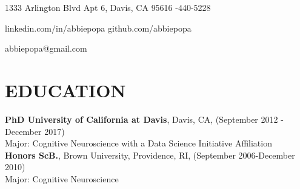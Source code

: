 \documentclass[line,margin,10pt]{res}
\begin{document}
 
\begin{resume}
\hoffset\centerline 
{1333 Arlington Blvd Apt 6, Davis, CA 95616  \quad \quad \quad \quad \quad \quad \quad \quad \quad \quad \quad\quad \quad \quad \quad \quad \quad \quad \quad \quad \quad \quad  \quad \quad {}-440-5228}
\hoffset\centerline 
{\hspace{0.05cm} linkedin.com/in/abbiepopa \quad \quad \quad \quad \quad \quad \quad \quad \quad \quad \quad\quad \quad \quad \quad \quad \quad \quad \quad \quad \quad \quad  \quad \quad \quad  \quad \quad \quad   \quad github.com/abbiepopa}
 \hoffset\centerline 
 {abbiepopa@gmail.com}
 
\section{EDUCATION} 
\textbf{PhD University of California at Davis}, Davis, CA, (September 2012 - December 2017)\\
Major: Cognitive Neuroscience with a Data Science Initiative Affiliation\\
\textbf{Honors ScB.}, Brown University, Providence, RI, (September 2006-December 2010)\\
                Major: Cognitive Neuroscience
								


\end{resume}
\end{document}

